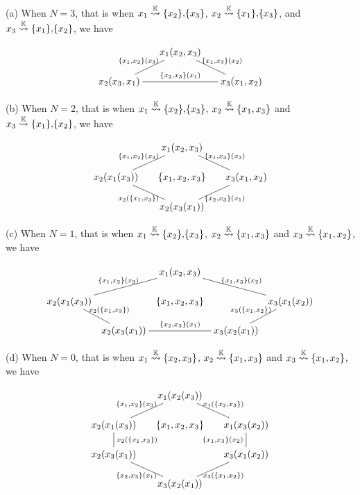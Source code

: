 \smallskip\noindent
(a)  When $N=3$, that is when $x_1\stackrel{{\mathbb K}}{\rightsquigarrow}\left\{x_2\right\}\!,\! \left\{x_3\right\}$, $x_2\stackrel{{\mathbb K}}{\rightsquigarrow}\left\{x_1\right\}\!,\! \left\{x_3\right\}$, and
 $x_3\stackrel{{\mathbb K}}{\rightsquigarrow}\left\{x_1\right\}\!,\! \left\{x_2\right\}$, we have
 
 $$\xymatrix @-1.65pc {&& x_1(x_2,x_3) \ar @{-}[ddll]_{\set{x_1,x_2}(x_3)} \ar @{-}[ddrr]^{\set{x_1,x_3}(x_2)}&& \\
 &&&&\\
 x_2(x_3,x_1) \ar @{-}[rrrr]^{\set{x_2,x_3}(x_1)} &&&& x_3(x_1,x_2)}$$

\smallskip\noindent
(b) When $N=2$, that is when $x_1\stackrel{{\mathbb K}}{\rightsquigarrow}\left\{x_2\right\}\!,\! \left\{x_3\right\}$, $x_2\stackrel{{\mathbb K}}{\rightsquigarrow}\left\{x_1,x_3\right\}$ and
 $x_3\stackrel{{\mathbb K}}{\rightsquigarrow}\left\{x_1\right\}\!,\! \left\{x_2\right\}$, we have
 
 $$ \xymatrix @-1.65pc {&& x_1(x_2,x_3) \ar @{-}[ddll]_{\set{x_1,x_2}(x_3)} \ar @{-}[ddrr]^{\set{x_1,x_3}(x_2)}&& \\
 &&&&\\
 x_2(x_1(x_3)) \ar @{-}[ddrr]_{x_2(\set{x_1,x_3})}&& \set{x_1,x_2,x_3}  && x_3(x_1,x_2)\ar @{-}[ddll]^{\set{x_2,x_3}(x_1)}\\
 &&&&\\
 &&  x_2(x_3(x_1))&&}$$

\smallskip\noindent
(c) When $N=1$, that is when $x_1\stackrel{{\mathbb K}}{\rightsquigarrow}\left\{x_2\right\}\!,\! \left\{x_3\right\}$, $x_2\stackrel{{\mathbb K}}{\rightsquigarrow}\left\{x_1,x_3\right\}$ and
 $x_3\stackrel{{\mathbb K}}{\rightsquigarrow}\left\{x_1,x_2\right\}$, we have
 
$$
 \xymatrix @-1.65pc {&& x_1(x_2,x_3) \ar @{-}[ddll]_{\set{x_1,x_2}(x_3)} \ar @{-}[ddrr]^{\set{x_1,x_3}(x_2)}&& \\
 &&&&\\
 x_2(x_1(x_3)) \ar @{-}[ddr]^{x_2(\set{x_1,x_3})}&& \set{x_1,x_2,x_3}  && x_3(x_1(x_2))\ar @{-}[ddl]_{x_3(\set{x_1,x_2})}\\
 &&&&\\
 &x_2(x_3(x_1))\ar @{-}[rr]^{\set{x_2,x_3}(x_1)}&  & x_3(x_2(x_1))&}
$$

\smallskip\noindent
(d) When $N=0$, that is when $x_1\stackrel{{\mathbb K}}{\rightsquigarrow}\left\{x_2,x_3\right\}$, $x_2\stackrel{{\mathbb K}}{\rightsquigarrow}\left\{x_1,x_3\right\}$ and
 $x_3\stackrel{{\mathbb K}}{\rightsquigarrow}\left\{x_1,x_2\right\}$, we have
 
 $$\xymatrix @-1.65pc {&& x_1(x_2(x_3)) \ar @{-}[ddll]_{\set{x_1,x_2}(x_3)} \ar @{-}[ddrr]^{x_1(\set{x_2,x_3})}&& \\
 &&&&\\
 x_2(x_1(x_3)) \ar @{-}[dd]^{x_2(\set{x_1,x_3})}&& \set{x_1,x_2,x_3} && x_1(x_3(x_2))\ar @{-}[dd]_{\set{x_1,x_3}(x_2)}\\
 &&  &&\\
 x_2(x_3(x_1)) \ar @{-}[ddrr]_{\set{x_2,x_3}(x_1)} &&  && \ar @{-}[ddll]^{x_3(\set{x_1,x_2})} x_3(x_1(x_2))\\
 &&&&\\
 &&  x_3(x_2(x_1))&&}
$$

